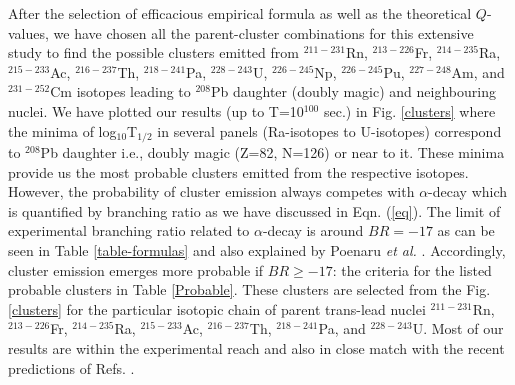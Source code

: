 \documentclass[preprint,10pt]{elsarticle}
\begin{document}
After the selection of efficacious empirical formula as well as the theoretical $Q$-values, we have chosen all the parent-cluster combinations for this extensive study to find the possible clusters emitted from $^{211-231}$Rn, $^{213-226}$Fr, $^{214-235}$Ra, $^{215-233}$Ac, $^{216-237}$Th, $^{218-241}$Pa, $^{228-243}$U, $^{226-245}$Np, $^{226-245}$Pu, $^{227-248}$Am, and $^{231-252}$Cm isotopes leading to $^{208}$Pb daughter (doubly magic) and neighbouring nuclei. We have plotted our results (up to T=10$^{100}$ sec.) in Fig. \ref{clusters} where the minima of log$_{10}$T$_{1/2}$ in several panels (Ra-isotopes to U-isotopes) correspond to $^{208}$Pb daughter i.e., doubly magic (Z=82, N=126) or near to it. These minima provide us the most probable clusters emitted from the respective isotopes. However, the probability of cluster emission always competes with $\alpha$-decay which is quantified by branching ratio as we have discussed in Eqn. (\ref{eq}). The limit of experimental branching ratio related to $\alpha$-decay is around $BR=-17$ as can be seen in Table \ref{table-formulas} and also explained by Poenaru \textit{et al.} \cite{Poenaru1991}. Accordingly, cluster emission emerges more probable if $BR\geq-17$: the criteria for the listed probable clusters in Table \ref{Probable}. These clusters are selected from the Fig. \ref{clusters} for the particular isotopic chain of parent trans-lead nuclei $^{211-231}$Rn, $^{213-226}$Fr, $^{214-235}$Ra, $^{215-233}$Ac, $^{216-237}$Th, $^{218-241}$Pa, and $^{228-243}$U. Most of our results are within the experimental reach and also in close match with the recent predictions of Refs. \cite{Santhosh2012,Santhosh2021,Adel2017}.\par
\end{document}
